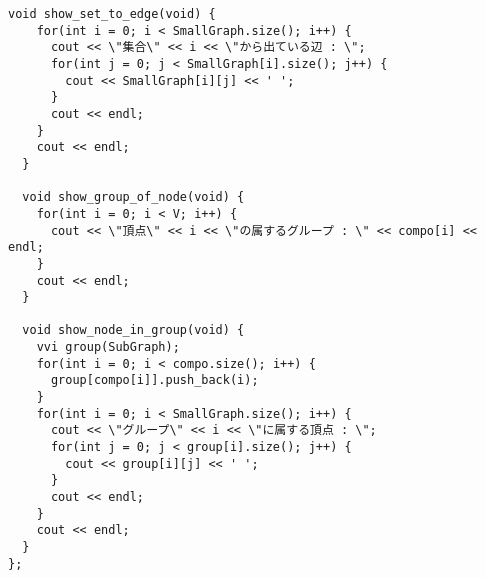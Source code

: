 \documentclass{jsarticle}
\begin{document}
\begin{lstlisting}[caption=StronglyConnectedComponent]
  void show_set_to_edge(void) {
    for(int i = 0; i < SmallGraph.size(); i++) {
      cout << \"集合\" << i << \"から出ている辺 : \";
      for(int j = 0; j < SmallGraph[i].size(); j++) {
        cout << SmallGraph[i][j] << ' ';
      }
      cout << endl;
    }
    cout << endl;
  }

  void show_group_of_node(void) {
    for(int i = 0; i < V; i++) {
      cout << \"頂点\" << i << \"の属するグループ : \" << compo[i] << endl;
    }
    cout << endl;
  }

  void show_node_in_group(void) {
    vvi group(SubGraph);
    for(int i = 0; i < compo.size(); i++) {
      group[compo[i]].push_back(i);
    }
    for(int i = 0; i < SmallGraph.size(); i++) {
      cout << \"グループ\" << i << \"に属する頂点 : \";
      for(int j = 0; j < group[i].size(); j++) {
        cout << group[i][j] << ' ';
      }
      cout << endl;
    }
    cout << endl;
  }
};

\end{lstlisting}

\color{white}
\end{document}

